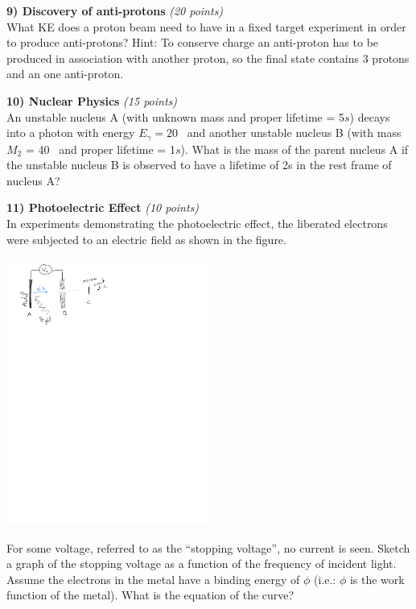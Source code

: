 {\vfill

\clearpage

\textbf{9) Discovery of anti-protons}  \hfill \textit{(20 points)}\\
What KE does a proton beam need to have in a fixed target experiment in order to produce anti-protons?
Hint: To conserve charge an anti-proton has to be produced in association with another proton, so the final state contains 3 protons and an one anti-proton.

\clearpage

\textbf{10) Nuclear Physics }\hfill \textit{(15 points)}\\
An unstable nucleus A (with unknown mass and proper lifetime = 5$s$) decays into a photon with energy $E_\gamma = 20$ \GeV\ and another unstable nucleus B (with mass $M_2$ = 40 \GeV\ and proper lifetime = 1$s$).
What is the mass of the parent nucleus A if the unstable nucleus B is observed to have a lifetime of 2s in the rest frame of nucleus A?


\clearpage

\textbf{11) Photoelectric Effect }\hfill \textit{(10 points)}\\
In experiments demonstrating the photoelectric effect, the liberated electrons were subjected to an electric field as shown in the figure.
\begin{center}
\includegraphics[width=0.5\textwidth]{./PhotoelectricExp.pdf}
\end{center}
For some voltage, referred to as the ``stopping voltage'', no current is seen.
Sketch a graph of the stopping voltage as a function of the frequency of incident light.
Assume the electrons in the metal have a binding energy of $\phi$ (i.e.: $\phi$ is the  work function of the metal).
What is the equation of the curve?


}
